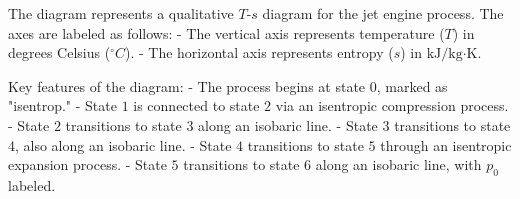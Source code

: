 The diagram represents a qualitative \( T \)-\( s \) diagram for the jet engine process. The axes are labeled as follows:  
- The vertical axis represents temperature (\( T \)) in degrees Celsius (\( ^\circ C \)).  
- The horizontal axis represents entropy (\( s \)) in \( \text{kJ}/\text{kg·K} \).  

Key features of the diagram:  
- The process begins at state \( 0 \), marked as "isentrop."  
- State \( 1 \) is connected to state \( 2 \) via an isentropic compression process.  
- State \( 2 \) transitions to state \( 3 \) along an isobaric line.  
- State \( 3 \) transitions to state \( 4 \), also along an isobaric line.  
- State \( 4 \) transitions to state \( 5 \) through an isentropic expansion process.  
- State \( 5 \) transitions to state \( 6 \) along an isobaric line, with \( p_0 \) labeled.